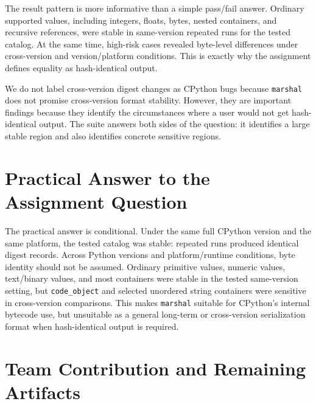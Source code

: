 \documentclass[10pt,a4paper]{article}
\begin{document}
The result pattern is more informative than a simple pass/fail answer. Ordinary supported values, including integers, floats, bytes, nested containers, and recursive references, were stable in same-version repeated runs for the tested catalog. At the same time, high-risk cases revealed byte-level differences under cross-version and version/platform conditions. This is exactly why the assignment defines equality as hash-identical output.

We do not label cross-version digest changes as CPython bugs because \texttt{marshal} does not promise cross-version format stability. However, they are important findings because they identify the circumstances where a user would not get hash-identical output. The suite answers both sides of the question: it identifies a large stable region and also identifies concrete sensitive regions.

\section{Practical Answer to the Assignment Question}

The practical answer is conditional. Under the same full CPython version and the same platform, the tested catalog was stable: repeated runs produced identical digest records. Across Python versions and platform/runtime conditions, byte identity should not be assumed. Ordinary primitive values, numeric values, text/binary values, and most containers were stable in the tested same-version setting, but \texttt{code\_object} and selected unordered string containers were sensitive in cross-version comparisons. This makes \texttt{marshal} suitable for CPython's internal bytecode use, but unsuitable as a general long-term or cross-version serialization format when hash-identical output is required.

\section{Team Contribution and Remaining Artifacts}

\begingroup
\small
\setlength{\tabcolsep}{5pt}
\renewcommand{\arraystretch}{1.10}
\end{document}
